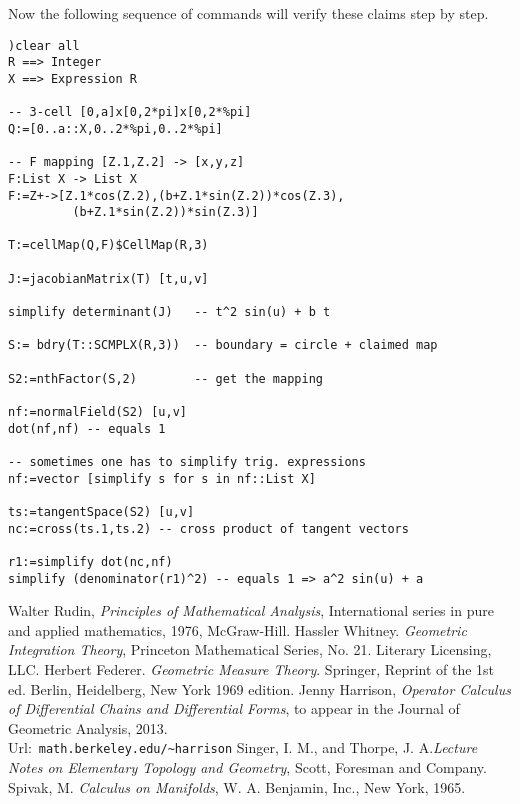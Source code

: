 \documentclass[12pt,a4paper]{article}
\begin{document}
Now the following sequence of commands will verify these claims
step by step.
\begin{lstlisting}
)clear all
R ==> Integer
X ==> Expression R

-- 3-cell [0,a]x[0,2*pi]x[0,2*%pi]
Q:=[0..a::X,0..2*%pi,0..2*%pi]

-- F mapping [Z.1,Z.2] -> [x,y,z]
F:List X -> List X
F:=Z+->[Z.1*cos(Z.2),(b+Z.1*sin(Z.2))*cos(Z.3),
         (b+Z.1*sin(Z.2))*sin(Z.3)]

T:=cellMap(Q,F)$CellMap(R,3)

J:=jacobianMatrix(T) [t,u,v]

simplify determinant(J)   -- t^2 sin(u) + b t

S:= bdry(T::SCMPLX(R,3))  -- boundary = circle + claimed map

S2:=nthFactor(S,2)        -- get the mapping

nf:=normalField(S2) [u,v]  
dot(nf,nf) -- equals 1

-- sometimes one has to simplify trig. expressions
nf:=vector [simplify s for s in nf::List X]

ts:=tangentSpace(S2) [u,v]
nc:=cross(ts.1,ts.2) -- cross product of tangent vectors

r1:=simplify dot(nc,nf)
simplify (denominator(r1)^2) -- equals 1 => a^2 sin(u) + a 
\end{lstlisting}
%
\iffalse
\begin{tikzpicture}
\begin{axis}[
    title=Exmple using the mesh parameter,
    hide axis,
    colormap/cool,
]
\addplot3[
    mesh,
    samples=50,
    domain=-8:8,
]
{sin(deg(sqrt(x^2+y^2)))/sqrt(x^2+y^2)};
\addlegendentry{$\frac{sin(r)}{r}$}
\end{axis}
\end{tikzpicture}
\fi
%
%
\begin{thebibliography}{1}
%
 Walter Rudin,
  {\em Principles of Mathematical Analysis},
  International series in pure and applied mathematics,
  1976, McGraw-Hill.
 Hassler Whitney. {\em Geometric Integration Theory},
  Princeton Mathematical Series, No. 21. Literary Licensing, LLC.
 Herbert Federer. {\em Geometric Measure Theory}. Springer,        
  Reprint of the 1st ed. Berlin, Heidelberg, New York 1969 edition.
 Jenny Harrison, {\em Operator Calculus of Differential
  Chains and Differential Forms}, to appear in the Journal of Geometric
  Analysis, 2013. \\
  Url:\ {\small {\tt math.berkeley.edu/\textasciitilde harrison}}
 Singer, I. M., and Thorpe, J. A.{\em Lecture Notes on 
  Elementary Topology and Geometry}, Scott, Foresman and Company. 
 Spivak, M. {\em Calculus on Manifolds}, W. A. Benjamin, 
  Inc., New York, 1965. 
\end{thebibliography}
%
\end{document}
